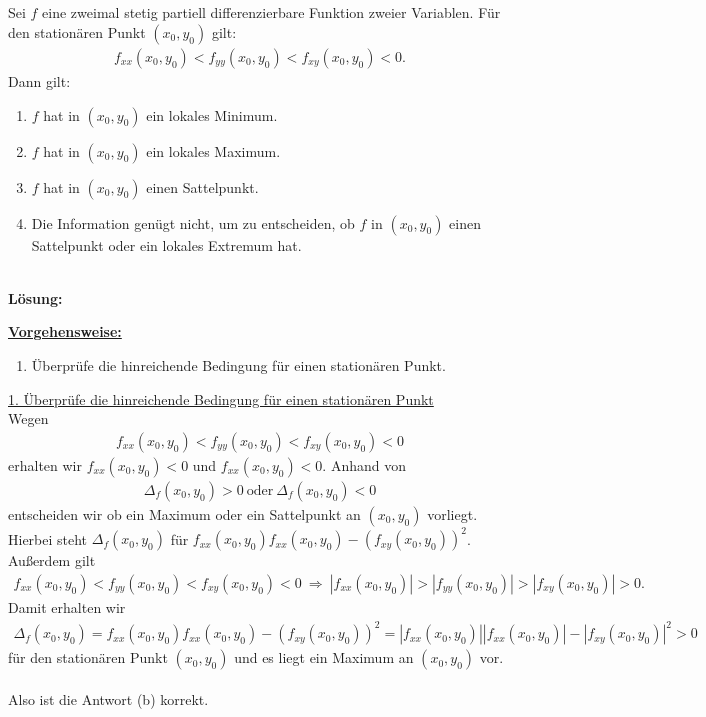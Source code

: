 \newpage

\subsection*{}
Sei $ f $ eine zweimal stetig partiell differenzierbare Funktion zweier Variablen. Für den stationären Punkt $ (x_0,y_0) $ gilt:
\begin{align*}
	f_{xx}(x_0,y_0) < f_{yy}(x_0,y_0) < f_{xy}(x_0,y_0) < 0.
\end{align*} 
Dann gilt:
\renewcommand{\labelenumi}{(\alph{enumi})}
\begin{enumerate}
	\item $ f $ hat in $ (x_0,y_0) $ ein lokales Minimum.
	\item $ f $ hat in $ (x_0,y_0) $ ein lokales Maximum.
	\item $ f $ hat in $ (x_0,y_0) $ einen Sattelpunkt.
	\item Die Information genügt nicht, um zu entscheiden, ob $ f $ in $ (x_0,y_0) $ einen Sattelpunkt oder ein lokales Extremum hat.
\end{enumerate}
\ \\
\textbf{Lösung:}
\begin{mdframed}
	\underline{\textbf{Vorgehensweise:}}
	\renewcommand{\labelenumi}{\theenumi.}
	\begin{enumerate}
		\item Überprüfe die hinreichende Bedingung für einen stationären Punkt.
	\end{enumerate}
\end{mdframed}
\underline{1. Überprüfe die hinreichende Bedingung für einen stationären Punkt}\\
Wegen 
\begin{align*}
	f_{xx}(x_0,y_0) < f_{yy}(x_0,y_0) < f_{xy}(x_0,y_0) < 0
\end{align*}
erhalten wir $ f_{xx}(x_0,y_0)  < 0 $ und $  f_{xx}(x_0,y_0) <0 $. 
Anhand von 
\begin{align*}
	\Delta_f(x_0,y_0)  > 0 
	 \ \textrm{oder} \
	 \Delta_f(x_0,y_0) < 0 
\end{align*}
entscheiden wir ob ein Maximum oder ein Sattelpunkt an $ (x_0,y_0) $ vorliegt. 
Hierbei steht $ \Delta_f(x_0,y_0) $ für $ f_{xx}(x_0,y_0) f_{xx}(x_0,y_0) - ( f_{xy}(x_0,y_0))^2 $.
Außerdem gilt 
\begin{align*}
	f_{xx}(x_0,y_0) < f_{yy}(x_0,y_0) < f_{xy}(x_0,y_0) < 0
	\ \Rightarrow \
	|f_{xx}(x_0,y_0)| > |f_{yy}(x_0,y_0)| > |f_{xy}(x_0,y_0)| > 0.
\end{align*}
Damit erhalten wir  
\begin{align*}
	\Delta_f(x_0,y_0) =
	f_{xx}(x_0,y_0) f_{xx}(x_0,y_0) - ( f_{xy}(x_0,y_0))^2 
	=
	|f_{xx}(x_0,y_0)| |f_{xx}(x_0,y_0)| - | f_{xy}(x_0,y_0)|^2
	>0 
\end{align*}
für den stationären Punkt $ (x_0,y_0) $ und es liegt ein Maximum an $ (x_0,y_0) $ vor.\\
\\
Also ist die Antwort (b) korrekt.
\newpage
